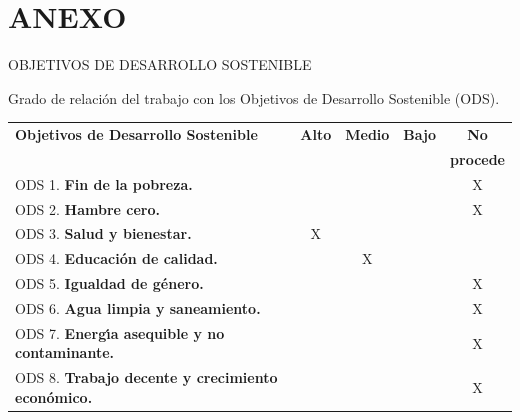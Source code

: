
\phantom{x}

\vspace{1ex}

\section*{ANEXO}

\vspace{2ex}

OBJETIVOS DE DESARROLLO SOSTENIBLE

\vspace{4ex}

Grado de relaci\'on del trabajo con los Objetivos de Desarrollo Sostenible (ODS).

\vspace{2ex}
\begin{tabular}{|l|c|c|c|c|}\hline
	\textbf{Objetivos de Desarrollo Sostenible}                  & \textbf{Alto} & \textbf{Medio} & \textbf{Bajo} & \textbf{No}      \\
	                                                             &               &                &               & \textbf{procede} \\ \hline
	ODS 1.  \textbf{Fin de la pobreza.}                          &               &                &               & X                \\ \hline
	ODS 2.  \textbf{Hambre cero.}                                &               &                &               & X                \\ \hline
	ODS 3.  \textbf{Salud y bienestar.}                          &         X      &               &               &                  \\ \hline
	ODS 4.  \textbf{Educaci\'on de calidad.}                     &               & X              &               &                  \\ \hline
	ODS 5.  \textbf{Igualdad de g\'enero.}                       &               &                &               & X                \\ \hline
	ODS 6.  \textbf{Agua limpia y saneamiento.}                  &               &                &               & X                \\ \hline
	ODS 7.  \textbf{Energ\'{\i}a asequible y no contaminante.}   &               &                &               & X                \\ \hline
	ODS 8.  \textbf{Trabajo decente y crecimiento econ\'omico.}  &               &                &               & X                \\ \hline

\end{tabular}
